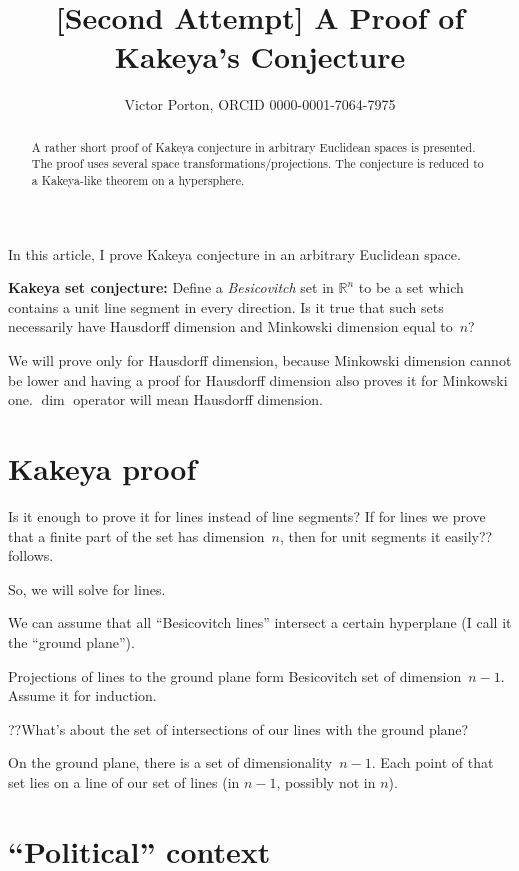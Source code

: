 \documentclass[oneside,draft]{amsart}
\title{[Second Attempt] A Proof of Kakeya's Conjecture}
\author{Victor Porton, ORCID 0000-0001-7064-7975}
\begin{document}
\begin{abstract}
A rather short proof of Kakeya conjecture in arbitrary Euclidean spaces is presented. The proof uses several space transformations/projections. The conjecture is reduced to a Ka\-ke\-ya-li\-ke theorem on a hypersphere.
\end{abstract}

\maketitle

In this article, I prove Kakeya conjecture in an arbitrary Euclidean space.

\textbf{Kakeya set conjecture:} \cite{kakeya-long,tao-blog-kakeya} Define a \emph{Besicovitch} set in $\mathbb{R}^n$ to be a set which contains a unit line segment in every direction. Is it true that such sets necessarily have Hausdorff dimension and Minkowski dimension equal to~$n$?

We will prove only for Hausdorff dimension, because Minkowski dimension cannot be lower and having a proof for Hausdorff dimension also proves it for Minkowski one. $\dim$ operator will mean Hausdorff dimension.

\section{Kakeya proof}

Is it enough to prove it for lines instead of line segments? If for lines we prove that a finite part of the set has dimension~$n$, then for unit segments it easily?? follows.

So, we will solve for lines.

We can assume that all ``Besicovitch lines'' intersect a certain hyperplane (I call it the ``ground plane'').

Projections of lines to the ground plane form Besicovitch set of dimension~$n-1$. Assume it for induction.

??What's about the set of intersections of our lines with the ground plane?

On the ground plane, there is a set of dimensionality~$n-1$. Each point of that set lies on a line of our set of lines (in $n-1$, possibly not in $n$).

\section{``Political'' context}
\end{document}
